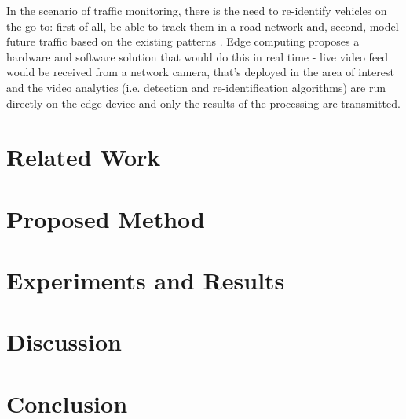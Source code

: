 \documentclass[conference]{IEEEtran} %
\begin{document}
 In the scenario of traffic monitoring, there is the need to re-identify vehicles on the go to: first of all, be able to track them in a road network and, second, model future traffic based on the existing patterns \cite{barthelemy2019edge}. Edge computing proposes a hardware and software solution that would do this in real time - live video feed would be received from a network camera, that's deployed in the area of interest and the video analytics (i.e. detection and re-identification algorithms) are run directly on the edge device and only the results of the processing are transmitted.
	
	\section{Related Work}
	
	\section{Proposed Method}
	
	\section{Experiments and Results}
	
	\section{Discussion}
	
	\section{Conclusion}
	
	
	
\end{document}
